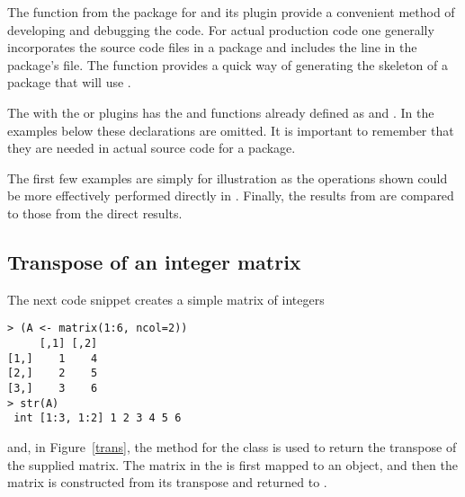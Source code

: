 \documentclass[shortnames,article]{jss}
\begin{document}
The  function from the  package \citep*{CRAN:inline} for
 and its  plugin provide a convenient method of
developing and debugging the  code.  For actual production code
one generally incorporates the  source code files in a package
and includes the line  in the package's
 file.  The  function
provides a quick way of generating the skeleton of a package that will use
.

The  with the  or 
plugins has the  and  functions already defined as
 and .  In the examples below
these declarations are omitted.  It is important to remember that they are
needed in actual  source code for a package.

The first few examples are simply for illustration as the operations
shown could be more effectively performed directly in .
Finally, the results from  are compared to those from the direct
 results.

\subsection{Transpose of an integer matrix}
\label{sec:transpose}

The next  code snippet creates a simple matrix of integers
\begin{verbatim}
> (A <- matrix(1:6, ncol=2))
     [,1] [,2]
[1,]    1    4
[2,]    2    5
[3,]    3    6
> str(A)
 int [1:3, 1:2] 1 2 3 4 5 6
\end{verbatim}
and, in Figure~\ref{trans}, the  method for the
 class is used to return the transpose of the supplied matrix. The 
matrix in the   is first mapped to an
 object, and then the matrix  is constructed
from its transpose and returned to .
\end{document}
